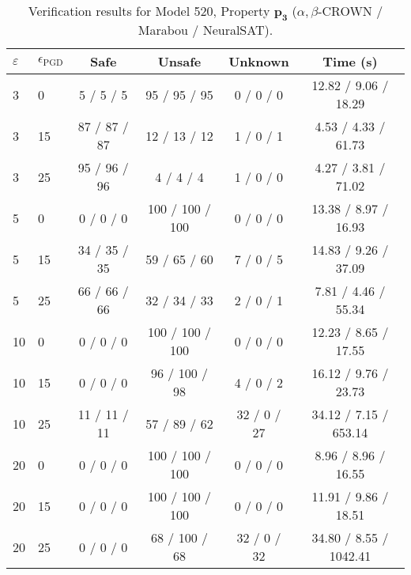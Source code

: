 \begin{table}[htbp]\centering
\caption{\small Verification results for Model 520, Property $\mathbf{p_{3}}$ ($\alpha,\beta$-CROWN / Marabou / NeuralSAT).}
\label{tab:model520_p3}
\begin{tabular}{llcccc}
\toprule
$\varepsilon$ & $\epsilon_{\scriptscriptstyle\mathrm{PGD}}$ & Safe & Unsafe & Unknown & Time (s) \\
\midrule
3 & 0 & 5 / 5 / 5 & 95 / 95 / 95 & 0 / 0 / 0 & 12.82 / 9.06 / 18.29 \\
3 & 15 & 87 / 87 / 87 & 12 / 13 / 12 & 1 / 0 / 1 & 4.53 / 4.33 / 61.73 \\
3 & 25 & 95 / 96 / 96 & 4 / 4 / 4 & 1 / 0 / 0 & 4.27 / 3.81 / 71.02 \\
5 & 0 & 0 / 0 / 0 & 100 / 100 / 100 & 0 / 0 / 0 & 13.38 / 8.97 / 16.93 \\
5 & 15 & 34 / 35 / 35 & 59 / 65 / 60 & 7 / 0 / 5 & 14.83 / 9.26 / 37.09 \\
5 & 25 & 66 / 66 / 66 & 32 / 34 / 33 & 2 / 0 / 1 & 7.81 / 4.46 / 55.34 \\
10 & 0 & 0 / 0 / 0 & 100 / 100 / 100 & 0 / 0 / 0 & 12.23 / 8.65 / 17.55 \\
10 & 15 & 0 / 0 / 0 & 96 / 100 / 98 & 4 / 0 / 2 & 16.12 / 9.76 / 23.73 \\
10 & 25 & 11 / 11 / 11 & 57 / 89 / 62 & 32 / 0 / 27 & 34.12 / 7.15 / 653.14 \\
20 & 0 & 0 / 0 / 0 & 100 / 100 / 100 & 0 / 0 / 0 & 8.96 / 8.96 / 16.55 \\
20 & 15 & 0 / 0 / 0 & 100 / 100 / 100 & 0 / 0 / 0 & 11.91 / 9.86 / 18.51 \\
20 & 25 & 0 / 0 / 0 & 68 / 100 / 68 & 32 / 0 / 32 & 34.80 / 8.55 / 1042.41 \\
\bottomrule
\end{tabular}
\end{table}
